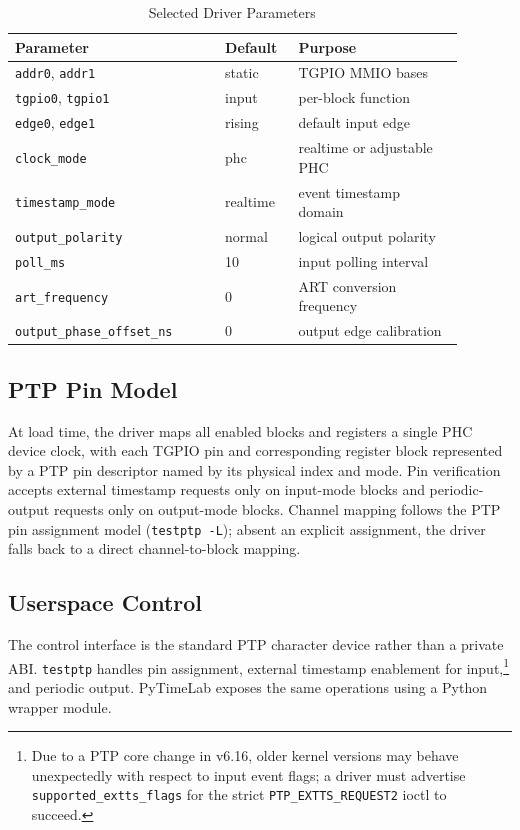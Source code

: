 \documentclass[conference,a4paper]{IEEEtran}
\newcommand{\PyLib}{PyTimeLab\xspace}
\begin{document}
\begin{table}[t]
\caption{Selected Driver Parameters}
\label{tab:params}
\centering
\footnotesize
\begin{tabular}{@{}p{0.42\linewidth}p{0.14\linewidth}p{0.33\linewidth}@{}}
\toprule
Parameter & Default & Purpose\\
\midrule
\texttt{addr0}, \texttt{addr1} & static & TGPIO MMIO bases\\
\texttt{tgpio0}, \texttt{tgpio1} & input & per-block function\\
\texttt{edge0}, \texttt{edge1} & rising & default input edge\\
\texttt{clock\_mode} & phc & realtime or adjustable PHC\\
\texttt{timestamp\_mode} & realtime & event timestamp domain\\
\texttt{output\_polarity} & normal & logical output polarity\\
\texttt{poll\_ms} & 10 & input polling interval\\
\texttt{art\_frequency} & 0 & ART conversion frequency\\
\texttt{output\_phase\_offset\_ns} & 0 & output edge calibration\\
\bottomrule
\end{tabular}
\end{table}

\subsection{PTP Pin Model}

At load time, the driver maps all enabled blocks and registers a single PHC device clock, with each TGPIO pin and corresponding register block represented by a PTP pin descriptor named by its physical index and mode. Pin verification accepts external timestamp requests only on input-mode blocks and periodic-output requests only on output-mode blocks. Channel mapping follows the PTP pin assignment model (\texttt{testptp -L}); absent an explicit assignment, the driver falls back to a direct channel-to-block mapping.

\subsection{Userspace Control}

The control interface is the standard PTP character device rather than a private ABI. \texttt{testptp} handles pin assignment, external timestamp enablement for input,\footnote{Due to a PTP core change in v6.16, older kernel versions may behave unexpectedly with respect to input event flags; a driver must advertise \texttt{supported\_extts\_flags} for the strict \texttt{PTP\_EXTTS\_REQUEST2} ioctl to succeed.} and periodic output. \PyLib exposes the same operations using a Python wrapper module.
\end{document}
